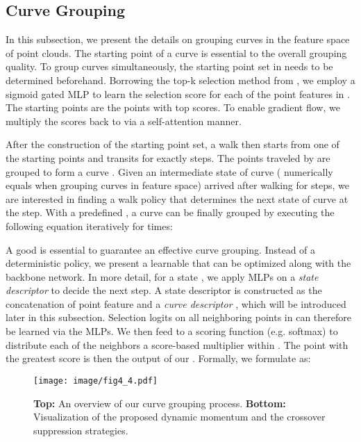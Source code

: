 \documentclass[10pt,twocolumn,letterpaper]{article}
\theoremstyle{definition}
\begin{document}
\subsection{Curve Grouping} \label{cg}

In this subsection, we present the details on grouping curves in the feature space of point clouds. The starting point of a curve is essential to the overall grouping quality. To group  curves simultaneously, the starting point set in  needs to be determined beforehand. Borrowing the top-k selection method from \cite{gao2019graph}, we employ a sigmoid gated MLP to learn the selection score for each of the point features in . The starting points are the points with top  scores. To enable gradient flow, we multiply the scores back to  via a self-attention manner.

After the construction of the starting point set, a walk  then starts from one of the starting points  and transits for exactly  steps. The points traveled by  are grouped to form a curve . Given an intermediate state of curve  ( numerically equals  when grouping curves in feature space) arrived after walking for  steps, we are interested in finding a walk policy  that determines the next state of curve at the  step. With a predefined , a curve  can be finally grouped by executing the following equation iteratively for  times:




A good  is essential to guarantee an effective curve grouping. Instead of a deterministic policy, we present a learnable  that can be optimized along with the backbone network. In more detail, for a state , we apply MLPs on a \textit{state descriptor}  to decide the next step. A state descriptor is constructed as the concatenation of point feature  and a \textit{curve descriptor} , which will be introduced later in this subsection. Selection logits  on all neighboring points in  can therefore be learned via the MLPs. We then feed  to a scoring function (e.g. softmax) to distribute each of the neighbors a score-based multiplier within . The point with the greatest score is then the output of our . Formally, we formulate  as:





\begin{figure}[t]
	\begin{center}
\texttt{[image: image/fig4\_4.pdf]}
	\end{center}
	\caption{\textbf{Top:} An overview of our curve grouping process. \textbf{Bottom:} Visualization of the proposed dynamic momentum and the crossover suppression strategies.}
	\label{fig:4}
\end{figure}
\end{document}
